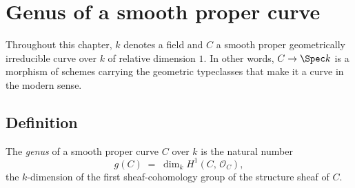 \chapter{Genus of a smooth proper curve}
\label{chap:Genus}

Throughout this chapter, \(k\) denotes a field and \(C\) a smooth proper geometrically irreducible curve over \(k\) of relative dimension \(1\). In other words, \(C \to \Spec k\) is a morphism of schemes carrying the geometric typeclasses that make it a curve in the modern sense.

\section{Definition}

\begin{definition}\leanok
  \label{def:genus}

  The \emph{genus} of a smooth proper curve \(C\) over \(k\) is the natural number
  \[
    g(C) \;=\; \dim_k H^1(C,\, \mathcal O_C),
  \]
  the \(k\)-dimension of the first sheaf-cohomology group of the structure sheaf of \(C\).
\end{definition}

